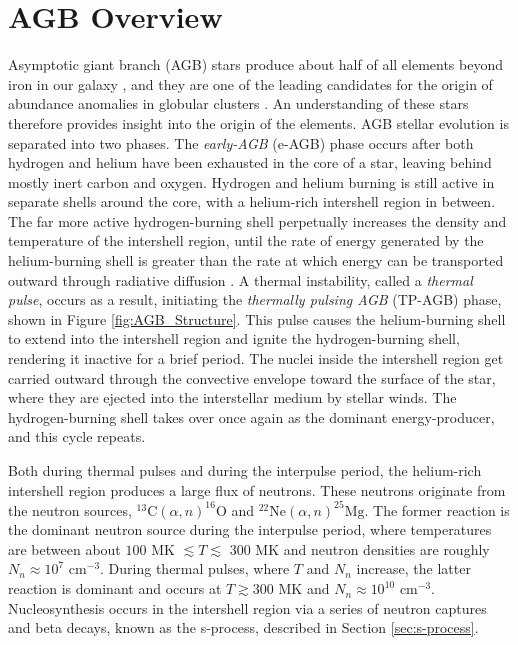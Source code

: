 \section{AGB Overview}
Asymptotic giant branch (AGB) stars produce about half of all elements beyond iron in our galaxy \cite{Busso1999}, and they are one of the leading candidates for the origin of abundance anomalies in globular clusters \cite{Prantzos2007}. An understanding of these stars therefore provides insight into the origin of the elements. AGB stellar evolution is separated into two phases. The \emph{early-AGB} (e-AGB) phase occurs after both hydrogen and helium have been exhausted in the core of a star, leaving behind mostly inert carbon and oxygen. Hydrogen and helium burning is still active in separate shells around the core, with a helium-rich intershell region in between. The far more active hydrogen-burning shell perpetually increases the density and temperature of the intershell region, until the rate of energy generated by the helium-burning shell is greater than the rate at which energy can be transported outward through radiative diffusion \cite{Iliadis2015}. A thermal instability, called a \emph{thermal pulse}, occurs as a result, initiating the \emph{thermally pulsing AGB} (TP-AGB) phase, shown in Figure \ref{fig:AGB_Structure}. This pulse causes the helium-burning shell to extend into the intershell region and ignite the hydrogen-burning shell, rendering it inactive for a brief period. The nuclei inside the intershell region get carried outward through the convective envelope toward the surface of the star, where they are ejected into the interstellar medium by stellar winds. The hydrogen-burning shell takes over once again as the dominant energy-producer, and this cycle repeats.

Both during thermal pulses and during the interpulse period, the helium-rich intershell region produces a large flux of neutrons. These neutrons originate from the neutron sources, $^{13}\mathrm{C}(\alpha,n)^{16}\mathrm{O}$ and $^{22}\mathrm{Ne}(\alpha,n)^{25}\mathrm{Mg}$. The former reaction is the dominant neutron source during the interpulse period, where temperatures are between about $100$ MK $\lesssim T \lesssim$ 300 MK and neutron densities are roughly $N_{n} \approx 10^{7}$ $\mathrm{cm}^{-3}$. During thermal pulses, where $T$ and $N_{n}$ increase, the latter reaction is dominant and occurs at $T \gtrsim 300$ MK and $N_{n} \approx 10^{10}$ $\mathrm{cm}^{-3}$. Nucleosynthesis occurs in the intershell region via a series of neutron captures and beta decays, known as the s-process, described in Section \ref{sec:s-process}.

